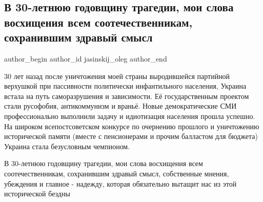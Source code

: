  
 
 
 
 
 
\subsection{В 30-летнюю годовщину трагедии, мои слова восхищения всем соотечественникам, сохранившим здравый смысл}
\label{sec:24_08_2021.fb.jasinskij_oleg.1.nezavisimost_zdravyj_smysl}
 
\ifcmt
 author_begin
   author_id jasinskij_oleg
 author_end
\fi

30 лет назад после уничтожения моей страны выродившейся партийной верхушкой при
пассивности политически инфантильного населения, Украина встала на путь
саморазрушения и зависимости. Её государственным проектом стали русофобия,
антикоммунизм и враньё. Новые демократические СМИ профессионально выполнили
задачу и идиотизация населения прошла успешно. На широком всепостсоветском
конкурсе по очернению прошлого и уничтожению исторической памяти (вместе с
пенсионерами и прочим балластом для бюджета) Украина стала безусловным
чемпионом. 

В 30-летнюю годовщину трагедии, мои слова восхищения всем соотечественникам,
сохранившим здравый смысл, собственные мнения, убеждения и главное - надежду,
которая обязательно вытащит нас из этой исторической бездны
